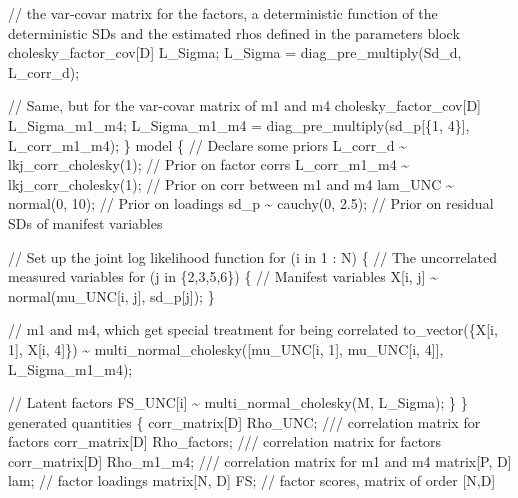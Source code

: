 \documentclass[
  letterpaper,
  DIV=11,
  numbers=noendperiod]{scrreprt}
\newenvironment{Shaded}{\begin{snugshade}}{\end{snugshade}}
\newcommand{\CommentTok}[1]{\textcolor[rgb]{0.37,0.37,0.37}{#1}}
\newcommand{\ControlFlowTok}[1]{\textcolor[rgb]{0.00,0.23,0.31}{#1}}
\newcommand{\DataTypeTok}[1]{\textcolor[rgb]{0.68,0.00,0.00}{#1}}
\newcommand{\DecValTok}[1]{\textcolor[rgb]{0.68,0.00,0.00}{#1}}
\newcommand{\FloatTok}[1]{\textcolor[rgb]{0.68,0.00,0.00}{#1}}
\newcommand{\KeywordTok}[1]{\textcolor[rgb]{0.00,0.23,0.31}{#1}}
\newcommand{\NormalTok}[1]{\textcolor[rgb]{0.00,0.23,0.31}{#1}}
\begin{document}
\begin{Shaded}
\begin{Highlighting}[]
  \CommentTok{// the var{-}covar matrix for the factors, a deterministic function of the deterministic SDs and the estimated rhos defined in the parameters block}
  \DataTypeTok{cholesky\_factor\_cov}\NormalTok{[D] L\_Sigma;}
\NormalTok{  L\_Sigma = diag\_pre\_multiply(Sd\_d, L\_corr\_d);}

  \CommentTok{// Same, but for the var{-}covar matrix of m1 and m4}
  \DataTypeTok{cholesky\_factor\_cov}\NormalTok{[D] L\_Sigma\_m1\_m4;}
\NormalTok{  L\_Sigma\_m1\_m4 = diag\_pre\_multiply(sd\_p[\{}\DecValTok{1}\NormalTok{, }\DecValTok{4}\NormalTok{\}], L\_corr\_m1\_m4);}
\NormalTok{\}}
\KeywordTok{model}\NormalTok{ \{}
  \CommentTok{// Declare some priors}
\NormalTok{  L\_corr\_d \textasciitilde{} lkj\_corr\_cholesky(}\DecValTok{1}\NormalTok{); }\CommentTok{// Prior on factor corrs}
\NormalTok{  L\_corr\_m1\_m4 \textasciitilde{} lkj\_corr\_cholesky(}\DecValTok{1}\NormalTok{); }\CommentTok{// Prior on corr between m1 and m4}
\NormalTok{  lam\_UNC \textasciitilde{} normal(}\DecValTok{0}\NormalTok{, }\DecValTok{10}\NormalTok{); }\CommentTok{// Prior on loadings}
\NormalTok{  sd\_p \textasciitilde{} cauchy(}\DecValTok{0}\NormalTok{, }\FloatTok{2.5}\NormalTok{); }\CommentTok{// Prior on residual SDs of manifest variables}

  \CommentTok{// Set up the joint log likelihood function}
  \ControlFlowTok{for}\NormalTok{ (i }\ControlFlowTok{in} \DecValTok{1}\NormalTok{ : N) \{}
    \CommentTok{// The uncorrelated measured variables}
    \ControlFlowTok{for}\NormalTok{ (j }\ControlFlowTok{in}\NormalTok{ \{}\DecValTok{2}\NormalTok{,}\DecValTok{3}\NormalTok{,}\DecValTok{5}\NormalTok{,}\DecValTok{6}\NormalTok{\}) \{}
      \CommentTok{// Manifest variables}
\NormalTok{      X[i, j] \textasciitilde{} normal(mu\_UNC[i, j], sd\_p[j]);}
\NormalTok{    \}}

    \CommentTok{// m1 and m4, which get special treatment for being correlated}
\NormalTok{    to\_vector(\{X[i, }\DecValTok{1}\NormalTok{], X[i, }\DecValTok{4}\NormalTok{]\}) \textasciitilde{} multi\_normal\_cholesky([mu\_UNC[i, }\DecValTok{1}\NormalTok{], mu\_UNC[i, }\DecValTok{4}\NormalTok{]]\textquotesingle{}, L\_Sigma\_m1\_m4);}

    \CommentTok{// Latent factors}
\NormalTok{    FS\_UNC[i] \textasciitilde{} multi\_normal\_cholesky(M, L\_Sigma);}
\NormalTok{  \}}
\NormalTok{\}}
\KeywordTok{generated quantities}\NormalTok{ \{}
  \DataTypeTok{corr\_matrix}\NormalTok{[D] Rho\_UNC; }\CommentTok{/// correlation matrix for factors}
  \DataTypeTok{corr\_matrix}\NormalTok{[D] Rho\_factors; }\CommentTok{/// correlation matrix for factors}
  \DataTypeTok{corr\_matrix}\NormalTok{[D] Rho\_m1\_m4; }\CommentTok{/// correlation matrix for m1 and m4}
  \DataTypeTok{matrix}\NormalTok{[P, D] lam; }\CommentTok{// factor loadings}
  \DataTypeTok{matrix}\NormalTok{[N, D] FS; }\CommentTok{// factor scores, matrix of order [N,D]}
  

\end{Highlighting}
\end{Shaded}
\end{document}
